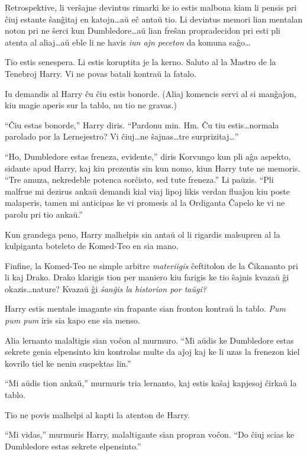 Retrospektive, li verŝajne devintus rimarki ke io estis malbona kiam
li pensis pri ĉiuj estante ŝanĝitaj en katojn\ldots aŭ eĉ antaŭ
tio. Li devintus memori lian mentalan noton pri ne ŝerci kun
Dumbledore\ldots aŭ lian freŝan propradecidon pri esti pli atenta al
aliaj\ldots aŭ eble li ne havis \emph{iun ajn peceton} da komuna
saĝo\ldots

Tio estis senespera. Li estis koruptita je la kerno. Saluto al la
Mastro de la Tenebroj Harry. Vi ne povas batali kontraŭ la fatalo.

Iu demandis al Harry ĉu ĉiu estis bonorde. (Aliaj komencis servi al si
manĝaĵon, kiu magie aperis sur la tablo, nu tio ne gravas.)

``Ĉiu estas bonorde,'' Harry diris. ``Pardonu min. Hm. Ĉu tiu
estis\ldots normala parolado por la Lernejestro? Vi ĉiuj\ldots ne
ŝajnas\ldots tre surprizitaj\ldots''

``Ho, Dumbledore estas freneza, evidente,'' diris Korvungo kun pli aĝa
aspekto, sidante apud Harry, kaj kiu prezentis sin kun nomo, kiun
Harry tute ne memoris. ``Tre amuza, nekredeble potenca sorĉisto, sed
tute freneza.'' Li paŭzis. ``Pli malfrue mi dezirus ankaŭ demandi kial
viaj lipoj likis verdan fluaĵon kiu poste malaperis, tamen mi
anticipas ke vi promesis al la Ordiganta Ĉapelo ke vi ne parolu pri
tio ankaŭ.''

Kun grandega peno, Harry malhelpis sin antaŭ ol li rigardis malsupren
al la kulpiganta boteleto de Komed-Teo en sia mano.

Finfine, la Komed-Teo ne simple arbitre \emph{materiigis} ĉeftitolon
de la Ĉikananto pri li kaj Drako. Drako klarigis tion per maniero kiu
farigis ke tio ŝajnis kvazaŭ ĝi okazis\ldots nature? Kvazaŭ ĝi
\emph{ŝanĝis la historion por taŭgi?}

Harry estis mentale imagante sin frapante sian fronton kontraŭ la
tablo. \emph{Pum pum pum} iris sia kapo ene sia menso.

Alia lernanto malaltigis sian voĉon al murmuro. ``Mi aŭdis ke
Dumbledore estas sekrete genia elpensinto kiu kontrolas multe da aĵoj
kaj ke li uzas la frenezon kiel kovrilo tiel ke neniu suspektas lin.''

``Mi aŭdis tion ankaŭ,'' murmuris tria lernanto, kaj estis kaŝaj
kapjesoj ĉirkaŭ la tablo.

Tio ne povis malhelpi al kapti la atenton de Harry.

``Mi vidas,'' murmuris Harry, malaltigante sian propran voĉon. ``Do
ĉiuj scias ke Dumbledore estas sekrete elpensinto.''

